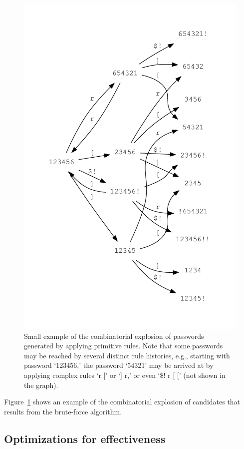 \documentclass[letterpaper,twocolumn,10pt]{article}
\begin{document}
\begin{figure}
\includegraphics[width=\linewidth]{example-pw-rules.pdf}
\caption{Small example of the combinatorial explosion of passwords generated by
applying primitive rules. Note that some passwords may be reached by several
distinct rule histories, e.g., starting with password `123456,' the password
`54321' may be arrived at by applying complex rules `r [' or `] r,' or
even `\$! r [ [' (not shown in the graph).}
\label{fig:pwgen}
\end{figure}

Figure~\ref{fig:pwgen} shows an example of the combinatorial explosion of
candidates that results from the brute-force algorithm.

\subsection{Optimizations for effectiveness}
\end{document}
